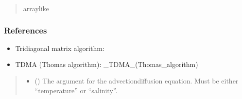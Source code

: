 \documentclass[a4paper,11pt,english,openany]{sphinxmanual}
\begin{document}
\begin{fulllineitems}
\begin{fulllineitems}
\begin{quote}
\begin{description}
\sphinxAtStartPar
array\sphinxhyphen{}like

\end{description}\end{quote}
\subsubsection*{References}
\begin{itemize}
\item {} 
\sphinxAtStartPar
Tridiagonal matrix algorithm: 

\item {} 
\sphinxAtStartPar
TDMA (Thomas algorithm): \sphinxhyphen{}\_TDMA\_(Thomas\_algorithm)

\end{itemize}

\end{fulllineitems}


\begin{fulllineitems}
\label{\detokenize{api/spyice.models.advection_diffusion:spyice.models.advection_diffusion.AdvectionDiffusion.__init__}}
\pysigstartsignatures
{}
\pysigstopsignatures\begin{quote}\begin{description}
\begin{itemize}
\item {} 
\sphinxAtStartPar
{} () \textendash{} The argument for the advection\sphinxhyphen{}diffusion equation. Must be either “temperature” or “salinity”.


\end{itemize}
\end{description}
\end{quote}
\end{fulllineitems}
\end{fulllineitems}
\end{document}
